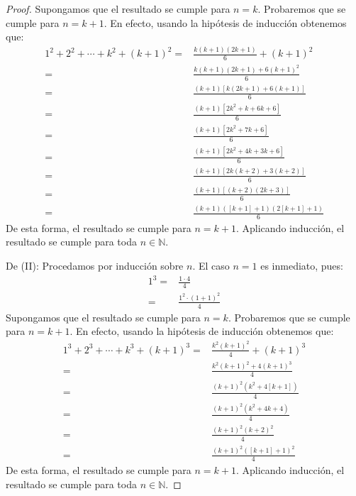 \documentclass[12pt]{article}
\begin{document}
\begin{enumerate}
\begin{proof}
        Supongamos que el resultado se cumple para $n=k$. Probaremos que se cumple para $n=k+1$. En efecto, usando la hipótesis de inducción obtenemos que:
        \begin{equation*}
            \begin{split}
                1^2+2^2+\cdots+k^2+(k+1)^2=&\frac{k(k+1)(2k+1)}{6}+(k+1)^2\\
                =&\frac{k(k+1)(2k+1)+6(k+1)^2}{6}\\
                =&\frac{(k+1)[k(2k+1)+6(k+1)]}{6}\\
                =&\frac{(k+1)[2k^2+k+6k+6]}{6}\\
                =&\frac{(k+1)[2k^2+7k+6]}{6}\\
                =&\frac{(k+1)[2k^2+4k+3k+6]}{6}\\
                =&\frac{(k+1)[2k(k+2)+3(k+2)]}{6}\\
                =&\frac{(k+1)[(k+2)(2k+3)]}{6}\\
                =&\frac{(k+1)([k+1]+1)(2[k+1]+1)}{6}
            \end{split}
        \end{equation*}
        De esta forma, el resultado se cumple para $n=k+1$. Aplicando inducción, el resultado se cumple para toda $n\in\mathbb{N}$.
        
        De (II): Procedamos por inducción sobre $n$. El caso $n=1$ es inmediato, pues:
        \begin{equation*}
            \begin{split}
                1^3=&\frac{1\cdot 4}{4}\\
                =&\frac{1^2\cdot (1+1)^2}{4}
            \end{split}
        \end{equation*}
        Supongamos que el resultado se cumple para $n=k$. Probaremos que se cumple para $n=k+1$. En efecto, usando la hipótesis de inducción obtenemos que:
        \begin{equation*}
            \begin{split}
                1^3+2^3+\cdots+k^3+(k+1)^3=&\frac{k^2\left(k+1\right)^2}{4}+(k+1)^3\\
                =&\frac{k^2\left(k+1\right)^2+4(k+1)^3}{4}\\
                =&\frac{(k+1)^2(k^2+4[k+1])}{4}\\
                =&\frac{(k+1)^2(k^2+4k+4)}{4}\\
                =&\frac{(k+1)^2(k+2)^2}{4}\\
                =&\frac{(k+1)^2([k+1]+1)^2}{4}
            \end{split}
        \end{equation*}
        De esta forma, el resultado se cumple para $n=k+1$. Aplicando inducción, el resultado se cumple para toda $n\in\mathbb{N}$.
        

\end{proof}
\end{enumerate}
\end{document}
